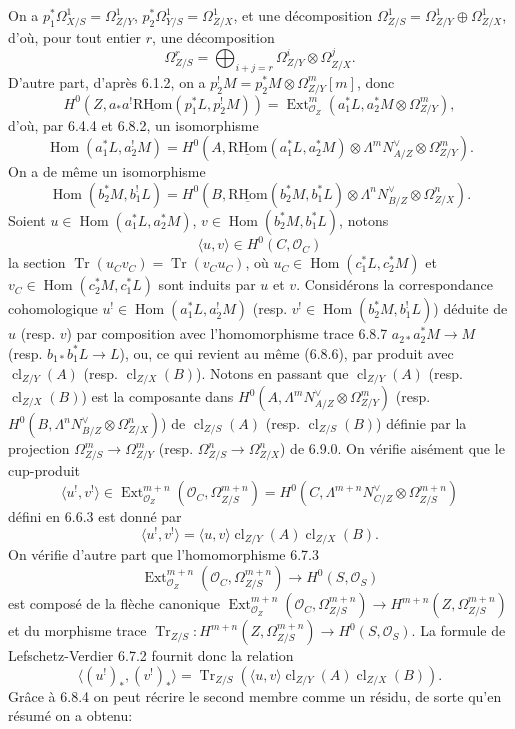 \documentclass[11pt]{article}
\DeclareMathOperator{\Hom}{Hom}
\DeclareMathOperator{\Ext}{Ext}
\newcommand{\R}{\mathrm{R}}\newcommand{\RHomCore}{\mathrm{RHom}}
\providecommand{\RHom}{\RHomCore}
\providecommand{\uRHom}{\underline{\RHom}}
\providecommand{\cl}{\operatorname{cl}}
\providecommand{\OO}{\mathcal{O}}
\providecommand{\RHom}{\RHomCore}
\providecommand{\Hom}{\operatorname{Hom}}
\providecommand{\RHom}{\R\mathcal{H}om}
\providecommand{\R}{\mathrm R}
\providecommand{\cl}{\operatorname{cl}}
\providecommand{\RHom}{\RHomCore}
\providecommand{\Hom}{\operatorname{Hom}}
\providecommand{\cl}{\operatorname{cl}}
\begin{document}
On a $p_1^*\Omega^1_{X/S}=\Omega^1_{Z/Y}$, $p_2^*\Omega^1_{Y/S}=\Omega^1_{Z/X}$, et une décomposition $\Omega^1_{Z/S}=\Omega^1_{Z/Y}\oplus\Omega^1_{Z/X}$, d'où, pour tout entier $r$, une décomposition
\begin{equation}
\tag{6.9.0}
\Omega^r_{Z/S}=\bigoplus_{i+j=r}\Omega^i_{Z/Y}\otimes\Omega^j_{Z/X}.
\end{equation}
D'autre part, d'après 6.1.2, on a $p_2^!M=p_2^*M\otimes\Omega^m_{Z/Y}[m]$, donc
\[
H^0(Z,a_*a^!\uRHom(p_1^*L,p_2^!M))=\Ext^m_{\OO_Z}(a_1^*L,a_2^*M\otimes\Omega^m_{Z/Y}),
\]
d'où, par 6.4.4 et 6.8.2, un isomorphisme
\begin{equation}
\tag{6.9.1}
\Hom(a_1^*L,a_2^!M)=H^0(A,\uRHom(a_1^*L,a_2^*M)\otimes\Lambda^m N_{A/Z}^{\vee}\otimes\Omega^m_{Z/Y}).
\end{equation}
On a de même un isomorphisme
\begin{equation}
\tag{6.9.2}
\Hom(b_2^*M,b_1^!L)=H^0(B,\uRHom(b_2^*M,b_1^*L)\otimes\Lambda^n N_{B/Z}^{\vee}\otimes\Omega^n_{Z/X}).
\end{equation}
Soient $u\in\Hom(a_1^*L,a_2^*M)$, $v\in\Hom(b_2^*M,b_1^*L)$, notons
\begin{equation}
\tag{6.9.3}
\langle u,v\rangle\in H^0(C,\OO_C)
\end{equation}
la
section $\operatorname{Tr}(u_Cv_C)=\operatorname{Tr}(v_Cu_C)$, où $u_C\in\Hom(c_1^*L,c_2^*M)$ et $v_C\in\Hom(c_2^*M,c_1^*L)$ sont induits par $u$ et $v$. Considérons la correspondance cohomologique $u^!\in\Hom(a_1^*L,a_2^!M)$ (resp. $v^!\in\Hom(b_2^*M,b_1^!L)$) déduite de $u$ (resp. $v$) par composition avec l'homomorphisme trace 6.8.7 $a_{2*}a_2^*M\to M$ (resp. $b_{1*}b_1^*L\to L$), ou, ce qui revient au même (6.8.6), par produit avec $\cl_{Z/Y}(A)$ (resp. $\cl_{Z/X}(B)$). Notons en passant que $\cl_{Z/Y}(A)$ (resp. $\cl_{Z/X}(B)$) est la composante dans $H^0(A,\Lambda^mN_{A/Z}^{\vee}\otimes\Omega^m_{Z/Y})$ (resp. $H^0(B,\Lambda^nN_{B/Z}^{\vee}\otimes\Omega^n_{Z/X})$) de $\cl_{Z/S}(A)$ (resp. $\cl_{Z/S}(B)$) définie par la projection $\Omega^m_{Z/S}\to\Omega^m_{Z/Y}$ (resp. $\Omega^n_{Z/S}\to\Omega^n_{Z/X}$) de 6.9.0. On vérifie aisément que le cup-produit
\[
\langle u^!,v^!\rangle\in\Ext^{m+n}_{\OO_Z}(\OO_C,\Omega^{m+n}_{Z/S})=H^0(C,\Lambda^{m+n}N_{C/Z}^{\vee}\otimes\Omega^{m+n}_{Z/S})
\]
défini en 6.6.3 est donné par
\begin{equation}
\tag{6.9.4}
\langle u^!,v^!\rangle=\langle u,v\rangle\cl_{Z/Y}(A)\cl_{Z/X}(B).
\end{equation}
On vérifie d'autre part que l'homomorphisme 6.7.3
\[
\Ext^{m+n}_{\OO_Z}(\OO_C,\Omega^{m+n}_{Z/S})\longrightarrow H^0(S,\OO_S)
\]
est composé de la flèche canonique $\Ext^{m+n}_{\OO_Z}(\OO_C,\Omega^{m+n}_{Z/S})\to H^{m+n}(Z,\Omega^{m+n}_{Z/S})$ et du morphisme trace $\operatorname{Tr}_{Z/S}:H^{m+n}(Z,\Omega^{m+n}_{Z/S})\to H^0(S,\OO_S)$. La formule de Lefschetz-Verdier 6.7.2 fournit donc la relation
\begin{equation}
\tag{6.9.5}
\langle (u^!)_*,(v^!)_*\rangle=\operatorname{Tr}_{Z/S}(\langle u,v\rangle\cl_{Z/Y}(A)\cl_{Z/X}(B)).
\end{equation}
Grâce à 6.8.4 on peut récrire le second membre comme un résidu, de sorte qu'en résumé on a obtenu:
\end{document}
